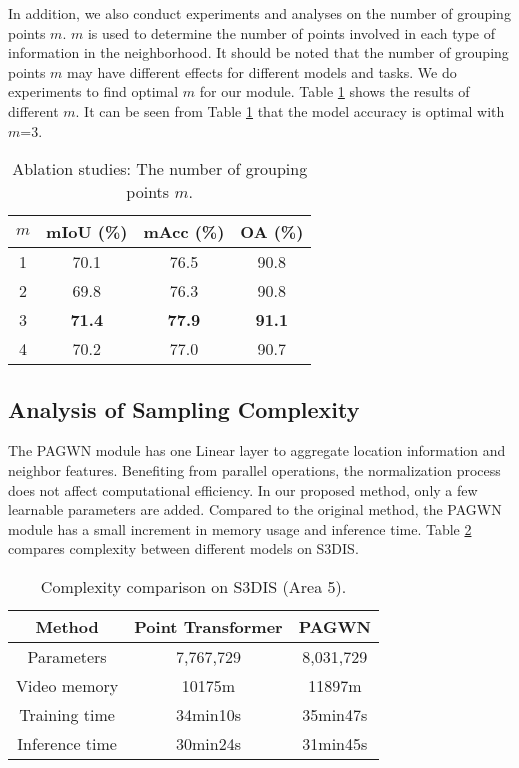 \documentclass[10pt,twocolumn,letterpaper]{article}
\begin{document}
        In addition, we also conduct experiments and analyses on the number of grouping points $m$. $m$ is used to determine the number of points involved in each type of information in the neighborhood. It should be noted that the number of grouping points $m$ may have different effects for different models and tasks. We do experiments to find optimal $m$ for our module. Table \ref{tab:3} shows the results of different $m$. It can be seen from Table \ref{tab:3} that the model accuracy is optimal with $m$=3.
        \begin{table}[!htb]\centering
            \renewcommand\arraystretch{1.1}
         \caption{Ablation studies: The number of grouping points $m$.}
        \begin{tabular}{c|ccc}
        \toprule
        $m$ & mIoU (\%) & mAcc (\%) & OA (\%) \\ \hline
        1 & 70.1 & 76.5 & 90.8 \\
        2 & 69.8 & 76.3 & 90.8 \\
        3 & \textbf{71.4} & \textbf{77.9} & \textbf{91.1} \\
        4 & 70.2 & 77.0 & 90.7 \\
        \bottomrule
        \end{tabular}
        \label{tab:3}
        \end{table}


    \subsection{Analysis of Sampling Complexity}

        The PAGWN module has one Linear layer to aggregate location information and neighbor features. Benefiting from parallel operations, the normalization process does not affect computational efficiency. In our proposed method, only a few learnable parameters are added. Compared to the original method, the PAGWN module has a small increment in memory usage and inference time. Table \ref{tab:5} compares complexity between different models on S3DIS.
        \begin{table}[!htb]\centering
          \setlength{\tabcolsep}{3mm}
            \renewcommand\arraystretch{1.1}
         \caption{Complexity comparison on S3DIS (Area 5).}
        \begin{tabular}{c|cc}
        \toprule
        Method                           & Point Transformer & PAGWN     \\ \hline
        Parameters       & 7,767,729        & 8,031,729 \\
        Video memory & 10175m           & 11897m    \\
        Training time  & 34min10s         & 35min47s  \\
        Inference time      & 30min24s         & 31min45s  \\
        \bottomrule
        \end{tabular}
        \label{tab:5}
        \end{table}
\end{document}
